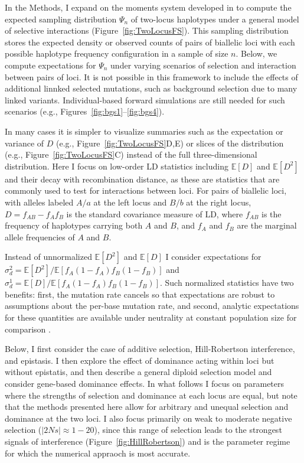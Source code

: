 \documentclass[]{article}
\newcommand{\E}{\mathbb{E}}
\begin{document}
In the Methods, I expand on the moments system developed in
\citet{Ragsdale2019-nt} to compute the expected sampling distribution
\(\Psi_n\) of two-locus haplotypes under a general model of selective
interactions (Figure~\ref{fig:TwoLocusFS}). This sampling distribution stores the
expected density or observed counts of pairs of biallelic loci with each
possible haplotype frequency configuration in a sample of size \(n\). Below, we
compute expectations for \(\Psi_n\) under varying scenarios of selection and
interaction between pairs of loci. It is not possible in this framework to
include the effects of additional linnked selected mutations, such as background
selection due to many linked variants. Individual-based forward simulations are
still needed for such scenarios (e.g., Figures~\ref{fig:bgs1}--\ref{fig:bgs4}).

In many cases it is simpler to visualize summaries such as the expectation or
variance of \(D\) (e.g., Figure~\ref{fig:TwoLocusFS}D,E) or slices of the
distribution (e.g., Figure~\ref{fig:TwoLocusFS}C) instead of the full
three-dimensional distribution. Here I focus on low-order LD statistics
including \(\E[D]\) and \(\E[D^2]\) and their decay with recombination
distance, as these are statistics that are commonly used to test for
interactions between loci. For pairs of biallelic loci, with alleles labeled
\(A/a\) at the left locus and \(B/b\) at the right locus, \(D=f_{AB}-f_A f_B\)
is the standard covariance measure of LD, where \(f_{AB}\) is the frequency of
haplotypes carrying both \(A\) and \(B\), and \(f_A\) and \(f_B\) are the
marginal allele frequencies of \(A\) and \(B\).

Instead of unnormalized \(\E[D^2]\) and \(\E[D]\) I consider expectations for
\(\sigma_d^2 = \E[D^2]/\E[f_A(1-f_A)f_B(1-f_B)]\) and
\(\sigma_d^1 = \E[D]/\E[f_A(1-f_A)f_B(1-f_B)]\).
Such normalized statistics have two benefits:
first, the mutation rate cancels so that expectations are robust to assumptions
about the per-base mutation rate, and second, analytic expectations for these
quantities are available under neutrality at constant population size for
comparison \citep{Ohta1971-yd}.

Below, I first consider the case of additive selection, Hill-Robertson
interference, and epistasis. I then explore the effect of dominance acting
within loci but without epistatis, and then describe a general diploid
selection model and consider gene-based dominance effects. In what follows I
focus on parameters where the strengths of selection and dominance at each
locus are equal, but note that the methods presented here allow for arbitrary
and unequal selection and dominance at the two loci. I also focus primarily on
weak to moderate negative selection (\(|2Ns| \approx 1 - 20\)), since this
range of selection leads to the strongest signals of interference
(Figure~\ref{fig:HillRobertson}) and is the parameter regime for which the
numerical appraoch is most accurate.
\end{document}
